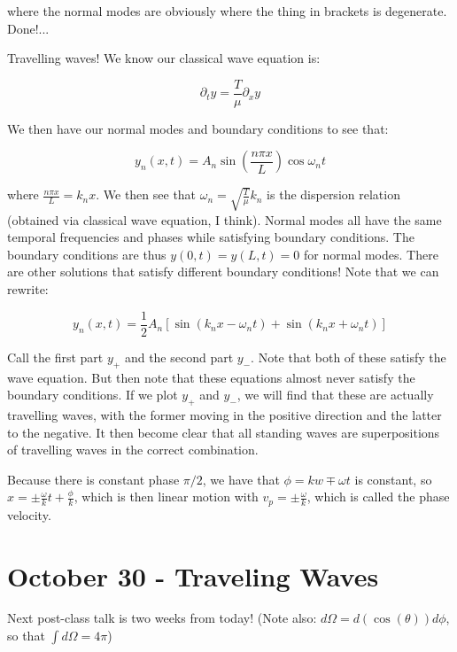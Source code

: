 \documentclass{report}
\begin{document}
where the normal modes are obviously where the thing in brackets is degenerate. Done!...

Travelling waves! We know our classical wave equation is:

$$\partial_ty = \frac{T}{\mu}\partial_xy$$

We then have our normal modes and boundary conditions to see that:

$$y_n(x,t) = A_n\sin\left(\frac{n\pi x}{L}\right)\cos\omega_nt$$

where $\frac{n\pi x}{L} = k_nx$. We then see that $\omega_n = \sqrt{\frac{T}{\mu}}k_n$ is the dispersion relation (obtained via classical wave equation, I think). Normal modes all have the same temporal frequencies and phases while satisfying boundary conditions. The boundary conditions are thus $y(0,t) = y(L,t) = 0$ for normal modes. There are other solutions that satisfy different boundary conditions! Note that we can rewrite:

$$y_n(x,t) = \frac{1}{2}A_n\left[\sin(k_nx - \omega_nt) + \sin(k_nx + \omega_nt)\right]$$

Call the first part $y_+$ and the second part $y_-$. Note that both of these satisfy the wave equation. But then note that these equations almost never satisfy the boundary conditions. If we plot $y_+$ and $y_-$, we will find that these are actually travelling waves, with the former moving in the positive direction and the latter to the negative. It then become clear that all standing waves are superpositions of travelling waves in the correct combination.

Because there is constant phase $\pi/2$, we have that $\phi = kw \mp \omega t$ is constant, so $x = \pm \frac{\omega}{k}t + \frac{\phi}{k}$, which is then linear motion with $v_p = \pm \frac{\omega}{k}$, which is called the phase velocity.

\chapter{October 30 - Traveling Waves}

Next post-class talk is two weeks from today! (Note also: $d\Omega = d(\cos(\theta))d\phi$, so that $\int{d\Omega} = 4\pi$)
\end{document}
